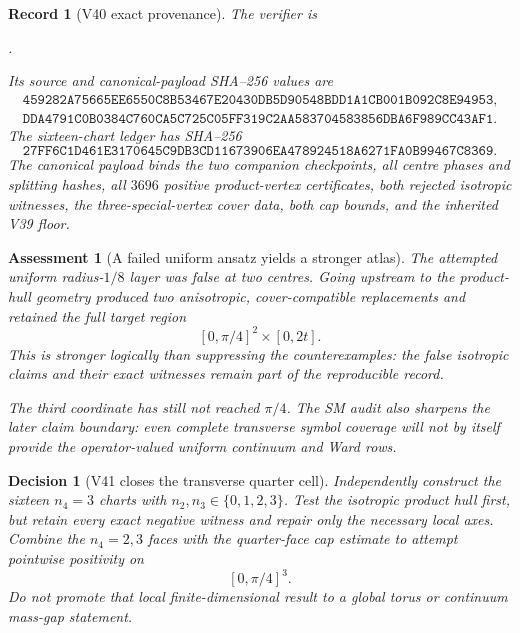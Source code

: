 \documentclass[11pt,oneside]{article}
\newtheorem{assessment}[theorem]{Assessment}
\newtheorem{record}[theorem]{Record}
\newtheorem{decision}[theorem]{Decision}
\theoremstyle{definition}
\theoremstyle{remark}
\begin{document}
\begin{record}[V40 exact provenance]
\label{rec:newv40-provenance}
The verifier is
\begin{center}
\footnotesize
{}.
\end{center}
Its source and canonical-payload SHA--256 values are
\[
\begin{gathered}
\texttt{459282A75665EE6550C8B53467E20430DB5D90548BDD1A1CB001B092C8E94953},\\
\texttt{DDA4791C0B0384C760CA5C725C05FF319C2AA583704583856DBA6F989CC43AF1}.
\end{gathered}                                         \tag{40.20}
\]
The sixteen-chart ledger has SHA--256
\[
\texttt{27FF6C1D461E3170645C9DB3CD11673906EA478924518A6271FA0B99467C8369}.
                                                               \tag{40.21}
\]
The canonical payload binds the two companion checkpoints, all
centre phases and splitting hashes, all \(3696\) positive
product-vertex certificates, both rejected isotropic witnesses, the
three-special-vertex cover data, both cap bounds, and the inherited
V39 floor.
\end{record}

\begin{assessment}[A failed uniform ansatz yields a stronger atlas]
\label{ass:newv40}
The attempted uniform radius-\(1/8\) layer was false at two centres.
Going upstream to the product-hull geometry produced two
anisotropic, cover-compatible replacements and retained the full
target region
\[
 [0,\pi/4]^2\times[0,2t].
\]
This is stronger logically than suppressing the counterexamples:
the false isotropic claims and their exact witnesses remain part of
the reproducible record.

The third coordinate has still not reached \(\pi/4\).  The SM audit
also sharpens the later claim boundary: even complete transverse
symbol coverage will not by itself provide the operator-valued
uniform continuum and Ward rows.
\end{assessment}

\begin{decision}[V41 closes the transverse quarter cell]
\label{dec:newv40-next}
Independently construct the sixteen \(n_4=3\) charts with
\(n_2,n_3\in\{0,1,2,3\}\).  Test the isotropic product hull first,
but retain every exact negative witness and repair only the
necessary local axes.  Combine the \(n_4=2,3\) faces with the
quarter-face cap estimate to attempt pointwise positivity on
\[
 [0,\pi/4]^3.
\]
Do not promote that local finite-dimensional result to a global
torus or continuum mass-gap statement.
\end{decision}
\end{document}

